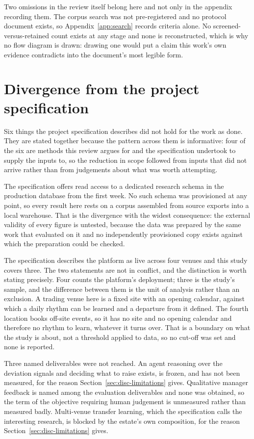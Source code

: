 Two omissions in the review itself belong here and not only in the appendix recording them. The
corpus search was not pre-registered and no protocol document exists, so
Appendix~\ref{app:search} records criteria alone. No screened-versus-retained
count exists at any stage and none is reconstructed, which is why no flow diagram is drawn:
drawing one would put a claim this work's own evidence contradicts into the document's most
legible form.

\section{Divergence from the project specification}
\label{sec:disc-specification}

Six things the project specification describes did not hold for the work as done. They are stated
together because the pattern across them is informative: four of the six are methods this review
argues for and the specification undertook to supply the inputs to, so the reduction in scope
followed from inputs that did not arrive rather than from judgements about what was worth
attempting.

The specification offers read access to a dedicated research schema in the production database
from the first week. No such schema was provisioned at any point, so every result here rests on a
corpus assembled from source exports into a local warehouse. That is the divergence with the
widest consequence: the external validity of every figure is untested, because the data was
prepared by the same work that evaluated on it and no independently provisioned copy exists
against which the preparation could be checked.

The specification describes the platform as live across four venues and this study covers three.
The two statements are not in conflict, and the distinction is worth stating precisely. Four
counts the platform's deployment; three is the study's sample, and the difference between them is
the unit of analysis rather than an exclusion. A trading venue here is a fixed site with an
opening calendar, against which a daily rhythm can be learned and a departure from it defined.
The fourth location books off-site events, so it has no site and no opening calendar and
therefore no rhythm to learn, whatever it turns over. That is a boundary on what the study is
about, not a threshold applied to data, so no cut-off was set and none is reported.

Three named deliverables were not reached. An agent reasoning over the deviation signals and
deciding what to raise exists, is frozen, and has not been measured, for the reason
Section~\ref{sec:disc-limitations} gives. Qualitative manager feedback is named among the
evaluation deliverables and none was obtained, so the term of the objective requiring human
judgement is unmeasured rather than measured badly. Multi-venue transfer learning, which the
specification calls the interesting research, is blocked by the estate's own composition, for the
reason Section~\ref{sec:disc-limitations} gives.


